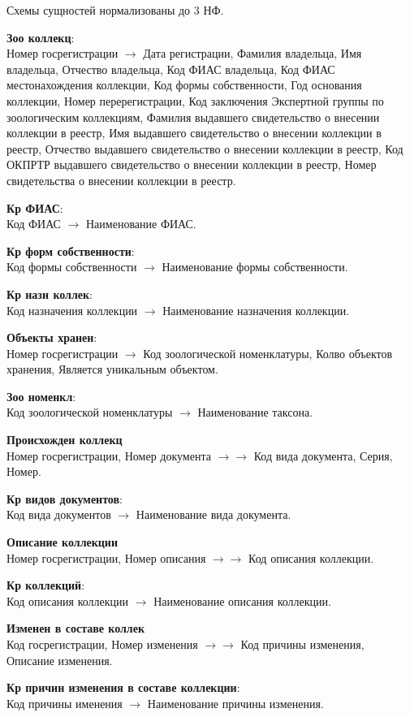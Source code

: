 \documentclass[10pt, a4paper, titlepage]{article}
\begin{document}
Схемы сущностей нормализованы до 3 НФ.
{
\newcommand\proof[3]{\textbf{#1}: \\ #2 $\rightarrow$ #3.}
\newcommand\pproof[3]{\textbf{#1} \\ #2 $\rightarrow\rightarrow$ #3.}
\newcommand\ppproof[3]{\textbf{#1} \\ #2 $\rightarrow\rightarrow\rightarrow$ #3.}
\newcommand\pppproof[3]{\textbf{#1} \\ #2 $\rightarrow\rightarrow\rightarrow\rightarrow$ #3.}

\proof{Зоо коллекц}{Номер госрегистрации}{Дата регистрации, Фамилия владельца, Имя владельца, Отчество владельца, Код ФИАС владельца, Код ФИАС местонахождения коллекции, Код формы собственности, Год основания коллекции, Номер перерегистрации, Код заключения Экспертной группы по зоологическим коллекциям, Фамилия выдавшего свидетельство о внесении коллекции в реестр, Имя выдавшего свидетельство о внесении коллекции в реестр, Отчество выдавшего свидетельство о внесении коллекции в реестр, Код ОКПРТР выдавшего свидетельство о внесении коллекции в реестр, Номер свидетельства о внесении коллекции в реестр}

\proof{Кр ФИАС}{Код ФИАС}{Наименование ФИАС}

\proof{Кр форм собственности}{Код формы собственности}{Наименование формы собственности}

\proof{Кр назн коллек}{Код назначения коллекции}{Наименование назначения коллекции}

\proof{Объекты хранен}{Номер госрегистрации}{Код зоологической номенклатуры, Колво объектов хранения, Является уникальным объектом}

\proof{Зоо номенкл}{Код зоологической номенклатуры}{Наименование таксона}

\pproof{Происхожден коллекц}{Номер госрегистрации, Номер документа}{Код вида документа, Серия, Номер}

\proof{Кр видов документов}{Код вида документов}{Наименование вида документа}

\pproof{Описание коллекции}{Номер госрегистрации, Номер описания}{Код описания коллекции}

\proof{Кр коллекций}{Код описания коллекции}{Наименование описания коллекции}

\pproof{Изменен в составе коллек}{Код госрегистрации, Номер изменения}{Код причины изменения, Описание изменения}

\proof{Кр причин изменения в составе коллекции}{Код причины именения}{Наименование причины изменения}

}
\end{document}
